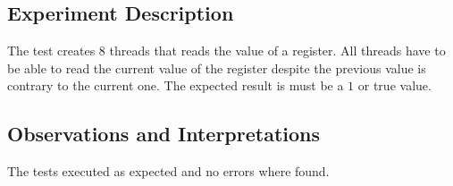 
\subsection{Experiment Description} 
\par
The test creates $8$ threads that reads the value of a register. All threads have to be able to read the current value of the register despite the previous value is contrary to the current one.
The expected result is must be a $1$ or true value.
\par


\subsection{Observations and Interpretations}
\par
The tests executed as expected and no errors where found.

